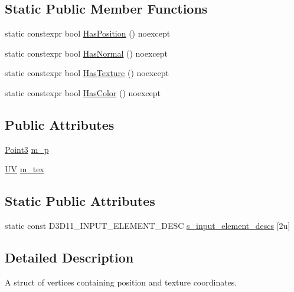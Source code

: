 \subsection*{Static Public Member Functions}
\begin{DoxyCompactItemize}
\item 
static constexpr bool \mbox{\hyperlink{structmage_1_1rendering_1_1_vertex_position_texture_a251093bc0caad749852ab5138f306909}{Has\+Position}} () noexcept
\item 
static constexpr bool \mbox{\hyperlink{structmage_1_1rendering_1_1_vertex_position_texture_abd20ebeb7462cc449cd4a41cf4d6c2c9}{Has\+Normal}} () noexcept
\item 
static constexpr bool \mbox{\hyperlink{structmage_1_1rendering_1_1_vertex_position_texture_aee946b0a6ec454ed0e6d0614965fb2ad}{Has\+Texture}} () noexcept
\item 
static constexpr bool \mbox{\hyperlink{structmage_1_1rendering_1_1_vertex_position_texture_a66d7754ec7a271ec3af1883774876646}{Has\+Color}} () noexcept
\end{DoxyCompactItemize}
\subsection*{Public Attributes}
\begin{DoxyCompactItemize}
\item 
\mbox{\hyperlink{structmage_1_1_point3}{Point3}} \mbox{\hyperlink{structmage_1_1rendering_1_1_vertex_position_texture_ae296d14afcc5b58ee99a1575d87f1e0f}{m\+\_\+p}}
\item 
\mbox{\hyperlink{structmage_1_1_u_v}{UV}} \mbox{\hyperlink{structmage_1_1rendering_1_1_vertex_position_texture_a958b1fdb6353ebc269606b9fcd8ab3d3}{m\+\_\+tex}}
\end{DoxyCompactItemize}
\subsection*{Static Public Attributes}
\begin{DoxyCompactItemize}
\item 
static const D3\+D11\+\_\+\+I\+N\+P\+U\+T\+\_\+\+E\+L\+E\+M\+E\+N\+T\+\_\+\+D\+E\+SC \mbox{\hyperlink{structmage_1_1rendering_1_1_vertex_position_texture_a979a97b011bafcf71084128aa6e25e48}{s\+\_\+input\+\_\+element\+\_\+descs}} \mbox{[}2u\mbox{]}
\end{DoxyCompactItemize}


\subsection{Detailed Description}
A struct of vertices containing position and texture coordinates. 

